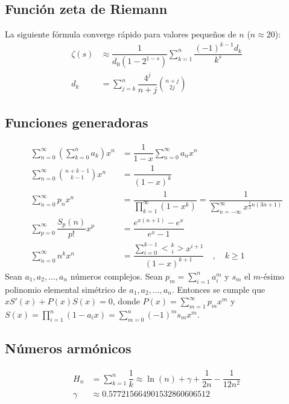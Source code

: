\documentclass[11pt]{article}
\newcommand{\genEuler}[3]{%
	\genfrac{<}{>}{0pt}{#1}{#2}{#3}%
}
\newcommand{\euler}[2]{\genEuler{}{#1}{#2}}
\begin{document}
		\subsection{Función zeta de Riemann}
			La siguiente fórmula converge rápido para valores pequeños de $n$ ($n \approx 20$):
			\begin{align*}
				\zeta(s) &\approx \dfrac{1}{d_0 (1 - 2^{1-s})} \sum_{k=1}^{n} \dfrac{(-1)^{k-1} d_k}{k^s} \\
				d_k &= \sum_{j=k}^{n} \dfrac{4^j}{n+j} \binom{n+j}{2j}
			\end{align*}
		
		\subsection{Funciones generadoras}
			\begin{align*}
				\sum_{n=0}^{\infty} \left( \sum_{k=0}^{n}a_k \right) x^n &= \dfrac{1}{1-x}\sum_{n=0}^{\infty} a_n x^n \\
				\sum_{n=0}^{\infty} \binom{n+k-1}{k-1}x^n &= \dfrac{1}{\left(1-x\right)^k} \\
				\sum_{n=0}^{\infty} p_n x^n &= \dfrac{1}{\displaystyle \prod_{k=1}^{\infty}(1-x^k)} = \dfrac{1}{\displaystyle \sum_{n=-\infty}^{\infty} x^{\frac{1}{2}n(3n+1)}} \\
				\sum_{p=0}^{\infty} \dfrac{S_p(n)}{p!} x^p &= \dfrac{e^{x(n+1)}-e^x}{e^x-1} \\
				\sum_{n=0}^{\infty} n^k x^n &= \dfrac{\displaystyle \sum_{i=0}^{k-1} \euler{k}{i} x^{i+1}}{(1-x)^{k+1}} \quad , \quad k \geq 1
			\end{align*}
			Sean $a_1, a_2, \ldots, a_n$ números complejos. Sean $p_m = \displaystyle \sum_{i=1}^{n} a_i^m$ y $s_m$ el $m$-ésimo polinomio elemental simétrico de $a_1, a_2, \ldots, a_n$. Entonces se cumple que $xS'(x) + P(x)S(x) = 0$, donde $P(x)=\displaystyle \sum_{m=1}^{\infty} p_m x^m$ y $S(x)=\displaystyle \prod_{i=1}^{n}(1-a_ix) = \sum_{m=0}^{n}(-1)^m s_m x^m$.
		
		\subsection{Números armónicos}
			\begin{align*}
				H_n &= \sum_{k=1}^{n} \dfrac{1}{k} \approx \ln(n) + \gamma + \dfrac{1}{2n} - \dfrac{1}{12n^2} \\
				\gamma &\approx 0.577215664901532860606512
			\end{align*}
		
\end{document}
